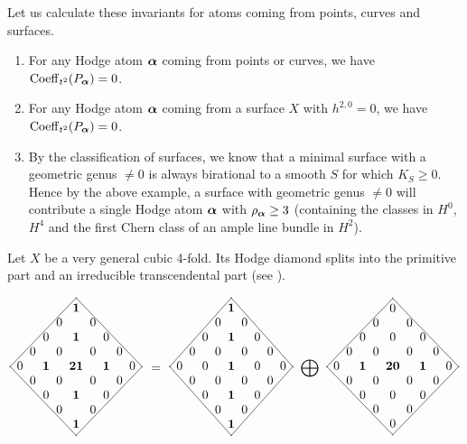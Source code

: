 \documentclass[twoside,leqno]{article}
\numberwithin{equation}{section}
\theoremstyle{plain}
\theoremstyle{definition}
\begin{document}
\medskip

Let us calculate these invariants for atoms coming from points, curves and surfaces.
\begin{enumerate}[wide]
    \item For any Hodge atom $\boldsymbol{\alpha}$ coming from points or curves, we have $\operatorname{Coeff}_{t^2}(P_{\boldsymbol{\alpha}}) = 0$.
    \item For any Hodge atom $\boldsymbol{\alpha}$ coming from a surface $X$ with $h^{2,0}=0$, we have $\operatorname{Coeff}_{t^2}(P_{\boldsymbol{\alpha}}) = 0$.
    \item By the classification of surfaces, we know that a minimal surface with a geometric genus $\neq 0$ is always birational to a smooth $S$ for which  $K_S \ge 0$.
    Hence by the above example, a surface with geometric genus $\neq 0$  will contribute  a single Hodge atom $\boldsymbol{\alpha}$ with $\rho_{\boldsymbol{\alpha}} \ge 3$ (containing the classes in $H^0$, $H^4$ and the first Chern class of an ample line bundle in $H^{2}$).
\end{enumerate}

\medskip

Let $X$ be a very general cubic 4-fold.
Its Hodge diamond splits into the primitive part and an irreducible transcendental part (see \cite{Voisin-cubicTorelli}).

\newcommand{\matrixtemplate}[7]{%
  \vcenter{\xymatrix@=1.8pt@M=1.8pt{
    & & & & & *=0{} \ar@{-}[dddddlllll] \ar@{-}[dddddrrrrr] & & & & & \\
    & & & & & #1 & & & & & \\
    & & & & 0 & & 0 & & & & \\
    & & & 0 & & #2 & & 0 & & & \\
    & & 0 & & 0 & & 0 & & 0 & & \\
    *=0{} & 0 & & #3 & & #4 & & #5 & & 0 & *=0{} \\
    & & 0 & & 0 & & 0 & & 0 & & \\
    & & & 0 & & #6 & & 0 & & & \\
    & & & & 0 & & 0 & & & & \\
    & & & & & #7 & & & & & \\
    & & & & & *=0{} \ar@{-}[uuuuulllll] \ar@{-}[uuuuurrrrr] & & & & &
  }}%
}

\[
  \matrixtemplate{\bluebf{1}}{\bluebf{1}}{\bluebf{1}}{\bluebf{21}}{\bluebf{1}}{\bluebf{1}}{\bluebf{1}}
  \;=\;
  \matrixtemplate{\bluebf{1}}{\bluebf{1}}{0}{\bluebf{1}}{0}{\bluebf{1}}{\bluebf{1}}
  \;\bigoplus\;
  \matrixtemplate{0}{0}{\bluebf{1}}{\bluebf{20}}{\bluebf{1}}{0}{0}
\]
\end{document}
